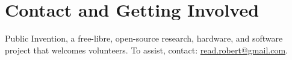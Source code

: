 \documentclass{article}
\begin{document}
\section{Contact and Getting Involved}

Public Invention,
a free-libre, open-source research, hardware, and software project that welcomes volunteers.
To assist, contact:
\href{mailto:read.robert@gmail.com}{read.robert@gmail.com}.



\end{document}
